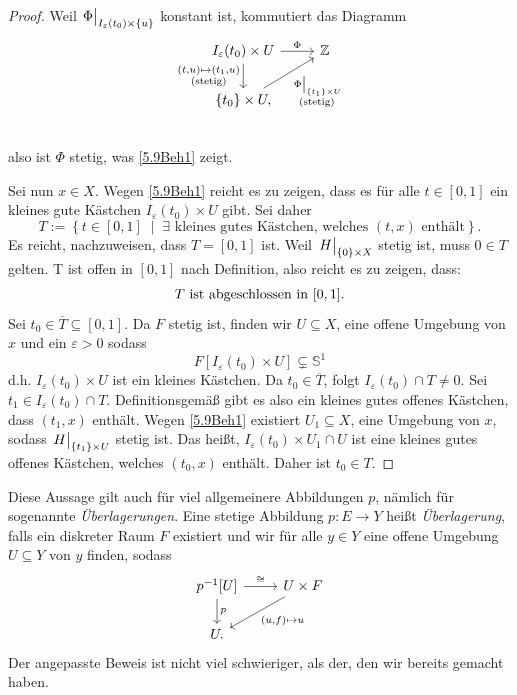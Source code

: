 \documentclass[
12pt, 
openany, 
a4paper, 
final,
fleqn, 
]{myclass}
\numberwithin{equation}{chapter}
\numberwithin{section}{chapter}
\newcommand{\ZZ}{\mathbb Z}
\newcommand{\closure}[1]{\overline{#1}}
\newcommand{\eval}[1]{\left. \vphantom{\int}#1\right\lvert}
\newcommand{\set}[2]{\left\{#1\;\middle|\;#2\right\}}
\begin{document}
\begin{proof}
Weil $ \eval \Phi_{I_{\varepsilon}(t_{0})\times \{u\}} $ konstant ist, kommutiert das Diagramm
\[ 
\begin{tikzcd}
I_{\varepsilon}(t_{0})\times U \arrow{r}{\Phi} \arrow[swap]{d}{\substack{(t, u)\mapsto (t_{1}, u)\\ \text{(stetig)}}}& \ZZ \\
\{t_{0}\}\times U,  \arrow[swap]{ur}{\substack{\eval \Phi_{\{t_{1}\}\times U}\\\text{(stetig)}}} & \\
\end{tikzcd}
\]
also ist $ \Phi $ stetig, was \eqref{5.9Beh1} zeigt. 

Sei nun $ x\in X $. Wegen \eqref{5.9Beh1} reicht es zu zeigen, dass es für alle $ t\in [0,1] $ ein kleines gute Kästchen $ I_{\varepsilon}(t_{0}) \times U$ gibt. Sei daher
\[
T := \set{t\in [0,1]}{\exists \text{ kleines gutes Kästchen, welches }(t, x)\text{ enthält}}. 
\]
Es reicht, nachzuweisen, dass $ T=[0,1] $ ist. Weil $ \eval H_{\{0\}\times X} $ stetig ist, muss $ 0\in T $ gelten. T ist offen in $ [0,1] $ nach Definition, also reicht es zu zeigen, dass:
\begin{equation}\label{5.9Beh2}
\text{$ T $ ist abgeschlossen in $ [0,1] $.}
\end{equation}
Sei $ t_{0}\in \closure{T} \subseteq [0, 1] $. Da $F$ stetig ist, finden wir $ U\subseteq X $, eine offene Umgebung von $ x $ und ein $ \varepsilon>0 $ sodass
\[
F[I_{\varepsilon}(t_{0})\times U]\subsetneq \mathbb{S}^{1}
\]
d.h. $ I_{\varepsilon}(t_{0})\times U $ ist ein kleines Kästchen. Da $ t_{0}\in \closure{T} $, folgt $ I_{\varepsilon}(t_{0})\cap T \neq 0 $. Sei $ t_{1}\in I_{\varepsilon}(t_{0})\cap T $. Definitionsgemäß gibt es also ein kleines gutes offenes Kästchen, dass $ (t_{1}, x) $ enthält. Wegen \eqref{5.9Beh1} existiert $ U_{1} \subseteq X$, eine Umgebung von $ x $, sodass $ \eval H_{\{t_{1}\}\times U} $ stetig ist. Das heißt, $ I_{\varepsilon}(t_{0})\times U_{1}\cap U $ ist eine kleines gutes offenes Kästchen, welches $ (t_{0}, x) $ enthält. Daher ist $ t_{0}\in T $. 
\end{proof}

\begin{rmk}\label{5.8}
Diese Aussage gilt auch für viel allgemeinere Abbildungen $ p $, nämlich für sogenannte \emph{Überlagerungen}.  Eine stetige Abbildung $ p: E\to Y $ heißt \emph{Überlagerung}, falls ein diskreter Raum $ F $ existiert und wir für alle $ y\in Y $ eine offene Umgebung $ U\subseteq Y $ von $ y $ finden, sodass 
\[
\begin{tikzcd}
p^{-1}[U] \arrow{r}{\cong}\arrow{d}{p} & U \times F \arrow{dl}{(u, f)\mapsto u}\\
U.
\end{tikzcd}
\]
Der angepasste Beweis ist nicht viel schwieriger, als der, den wir bereits gemacht haben.
\end{rmk}
\end{document}
